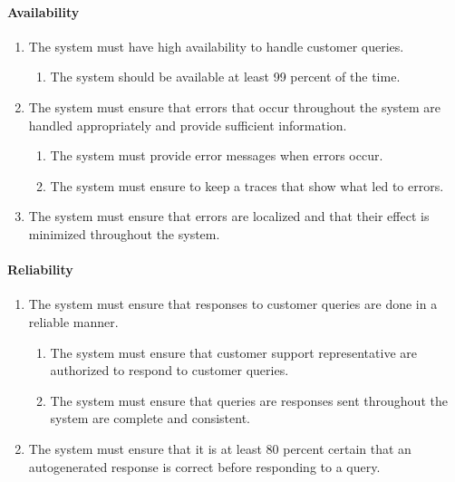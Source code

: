 \documentclass[11pt]{article}
\begin{document}
\paragraph{Availability}
\begin{enumerate}[label=R1.\arabic*.]
	\item The system must have high availability to handle customer queries.
	\begin{enumerate}[label*=\arabic*.]
		\item The system should be available at least 99 percent of the time.
	\end{enumerate}
	\item The system must ensure that errors that occur throughout the system are handled appropriately and provide sufficient
information.
%	
	\begin{enumerate}[label*=\arabic*.]
		\item The system must provide error messages when errors occur.
		\item The system must ensure to keep a traces that show what led to errors.
	\end{enumerate}
	\item The system must ensure that errors are localized and that their effect is minimized throughout the system.
\end{enumerate}

\paragraph{Reliability}
\begin{enumerate}[label=R1.\arabic*.]
	\item The system must ensure that responses to customer queries are done in a reliable manner.
	\begin{enumerate}[label*=\arabic*.]
		\item The system must ensure that customer support representative are authorized to respond to customer queries.
		\item The system must ensure that queries are responses sent throughout the system are complete and consistent.
	\end{enumerate}
	\item The system must ensure that it is at least 80 percent certain that an autogenerated response is correct before responding to a query.
\end{enumerate}
\end{document}
